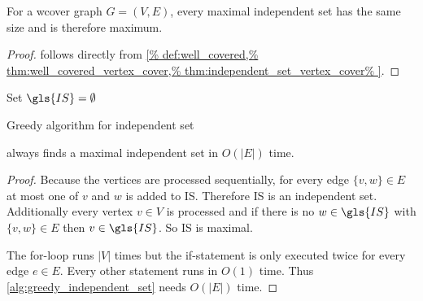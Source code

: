 
\begin{theorem}
  \label{thm:well_covered_independent_set}
  For a \gls{wcover} graph \(G=(V,E)\), every maximal independent set
  has the same size and is therefore maximum.
\end{theorem}

\begin{proof}
   follows directly from
  \cref{%
    def:well_covered,%
    thm:well_covered_vertex_cover,%
    thm:independent_set_vertex_cover%
  }.
\end{proof}



\begin{algorithm}
  \DontPrintSemicolon
  
  
  Set \(\gls{IS} = \emptyset\) \;
  \caption{\label{alg:greedy_independent_set}Greedy algorithm for independent set}
\end{algorithm}


\begin{theorem}
  \label{thm:greedy_independent_set}
   always finds a maximal independent
  set in \(O(|E|)\) time.
\end{theorem}

\begin{proof}
  Because the vertices are processed sequentially, for every edge
  \(\{v,w\} \in E\) at most one of \(v\) and \(w\) is added to
  \gls{IS}. Therefore \gls{IS} is an independent set. Additionally 
  every vertex \(v \in V\) is processed and if there is no
  \(w \in \gls{IS}\) with \(\{v,w\} \in E\) then \(v \in \gls{IS}\).
  So \gls{IS} is maximal.
  
  The for-loop runs \(|V|\) times but the if-statement is only
  executed twice for every edge \(e \in E\). Every other statement
  runs in \(O(1)\) time. Thus \cref{alg:greedy_independent_set} needs
  \(O(|E|)\) time.
\end{proof}

